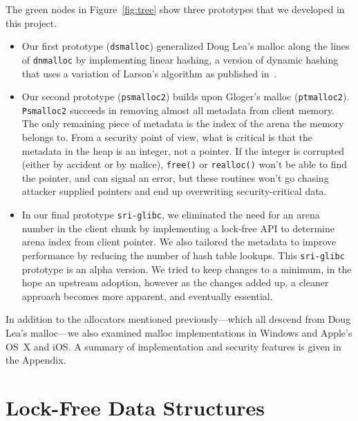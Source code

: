 \documentclass[twoside,12pt]{cslreport}
\begin{document}
The green nodes in Figure~\ref{fig:tree} show three prototypes that we
developed in this project.
\begin{itemize}
\item Our first prototype (\texttt{dsmalloc}) generalized Doug Lea's
  malloc along the lines of \texttt{dnmalloc} by implementing linear
  hashing, a version of dynamic hashing that uses a variation of
  Larson's algorithm as published in~\cite{Larson:1988:DHT}.

\item Our second prototype (\texttt{psmalloc2}) builds upon Gloger's malloc (\texttt{ptmalloc2}).
\texttt{Psmalloc2} succeeds in removing almost all metadata from 
client memory. The only remaining piece of metadata is the index of the arena
the memory belongs to.
From a security point of view, what is critical is that the metadata
in the heap is an integer, not a pointer. If the integer is corrupted
(either by accident or by malice), \texttt{free()} or
\texttt{realloc()} won't be able to find the pointer, and can signal
an error, but these routines won't go chasing attacker supplied
pointers and end up overwriting security-critical data.
  
\item In our final prototype \texttt{sri-glibc}, we eliminated the need for
an arena number in the client chunk by implementing a lock-free API to
determine arena index from client pointer. We also tailored the
metadata to improve performance by reducing the number of hash table
lookups.  This \texttt{sri-glibc} prototype is an alpha version. We
tried to keep changes to a minimum, in the hope an upstream adoption,
however as the changes added up, a cleaner approach becomes more
apparent, and eventually essential.
\end{itemize}

In addition to the allocators mentioned previously---which all descend
from Doug Lea's malloc---we also examined malloc implementations in
Windows and Apple's OS~X and iOS. A summary of implementation and
security features is given in the Appendix.


\section{Lock-Free Data Structures}
\label{lock-free}
\end{document}
